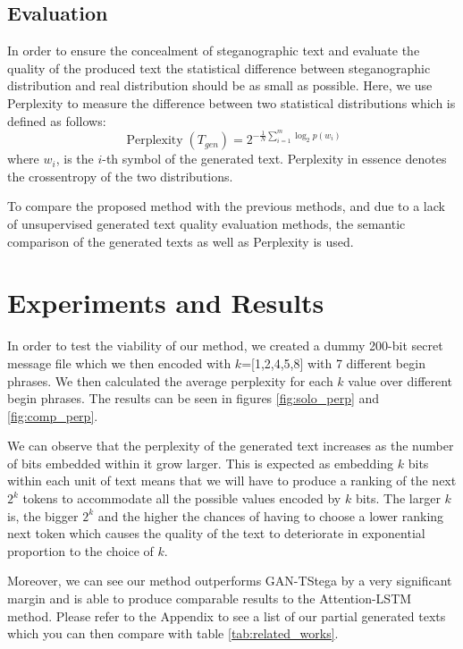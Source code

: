\documentclass[journal,onecolumn]{IEEEtran}
\begin{document}
\subsection{Evaluation}
In order to ensure the concealment of steganographic text and evaluate the quality of the produced text the statistical difference between steganographic distribution and real distribution should be as small as possible\cite{yang2020gan}. Here, we use Perplexity to measure the difference between two statistical distributions which is defined as follows:
\begin{equation}
	\operatorname{Perplexity}\left(T_{g e n}\right)=2^{-\frac{1}{N} \sum_{i=1}^m \log _2 p\left(w_i\right)}
\end{equation}
where $w_i$, is the $i$-th symbol of the generated text. Perplexity in essence denotes the crossentropy of the two distributions.

To compare the proposed method with the previous methods, and due to a lack of unsupervised generated text quality evaluation methods, the semantic comparison of the generated texts as well as Perplexity is used.

\section{Experiments and Results}
In order to test the viability of our method, we created a dummy 200-bit secret message file which we then encoded with $k$=[1,2,4,5,8] with 7 different begin phrases.
We then calculated the average perplexity for each $k$ value over different begin phrases. The results can be seen in figures \ref{fig:solo_perp} and \ref{fig:comp_perp}.

We can observe that the perplexity of the generated text increases as the number of bits embedded within it grow larger. 
This is expected as embedding $k$ bits within each unit of text means that we will have to produce a ranking of the next $2^k$
tokens to accommodate all the possible values encoded by $k$ bits. The larger $k$ is, the bigger $2^k$ and the higher the chances of
having to choose a lower ranking next token which causes the quality of the text to deteriorate in exponential proportion to the choice of $k$.

Moreover, we can see our method outperforms GAN-TStega by a very significant margin and is able to produce comparable results to the Attention-LSTM method.
Please refer to the Appendix to see a list of our partial generated texts which you can then compare with table \ref{tab:related_works}.
\end{document}
